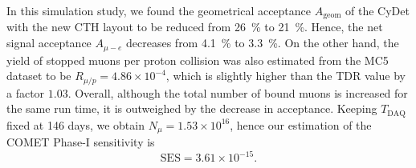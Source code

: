 In this simulation study, we found the geometrical acceptance $A_\mathrm{geom}$
of the CyDet with the new CTH layout to be reduced from \SI{26}{\percent} to
\SI{21}{\percent}. Hence, the net signal acceptance $A_{\mu-e}$ decreases from
\SI{4.1}{\percent} to \SI{3.3}{\percent}. On the other hand, the yield of
stopped muons per proton collision was also estimated from the MC5 dataset to be
$R_{\mu / p} = 4.86 \times 10^{-4}$, which is slightly higher than the TDR value
by a factor $1.03$. Overall, although the total number of bound muons is
increased for the same run time, it is outweighed by the decrease in acceptance.
Keeping $T_\mathrm{DAQ}$ fixed at 146 days, we obtain $N_\mu = 1.53 \times
10^{16}$, hence our estimation of the COMET Phase-I sensitivity is
$$
\mathrm{SES} = 3.61 \times 10^{-15}.
$$





